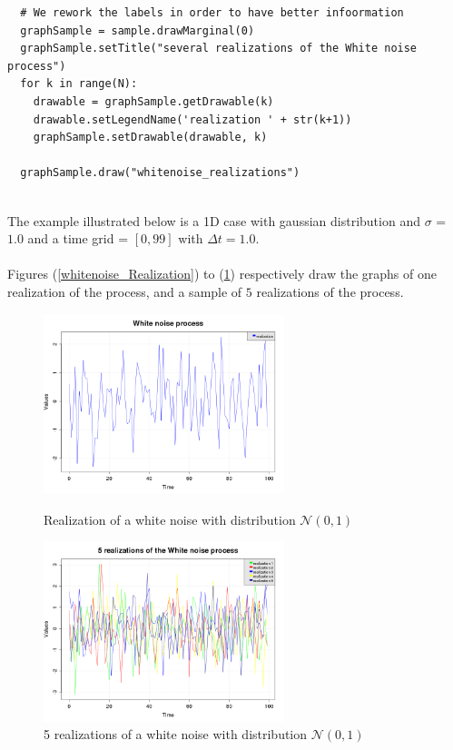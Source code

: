 \begin{lstlisting}
  # We rework the labels in order to have better infoormation
  graphSample = sample.drawMarginal(0)
  graphSample.setTitle("several realizations of the White noise process")
  for k in range(N):
    drawable = graphSample.getDrawable(k)
    drawable.setLegendName('realization ' + str(k+1))
    graphSample.setDrawable(drawable, k)

  graphSample.draw("whitenoise_realizations")

\end{lstlisting}

\textspace\\
The example illustrated below is a 1D case with gaussian distribution and $\sigma$ = $1.0$ and a time grid = $[0,99]$ with $\Delta t = 1.0$.\\ \\

Figures (\ref{whitenoise_Realization}) to (\ref{whitenoise_Realizations}) respectively draw the graphs of one realization of the process, and a sample of $5$ realizations of the process.


\begin{figure}[H]
  \begin{minipage}{9cm}
    \begin{center}
      \includegraphics[width=7cm]{whitenoise_realization.png}
      \caption{Realization of a white noise with distribution $\mathcal{N}(0, 1)$}
      \label{whitenoise_Realization}
    \end{center}
  \end{minipage}
  \hfill
  \begin{minipage}{9cm}
    \begin{center}
      \includegraphics[width=7cm]{whitenoise_realizations.png}
      \caption{5 realizations of a white noise with distribution $\mathcal{N}(0, 1)$}
      \label{whitenoise_Realizations}
    \end{center}
  \end{minipage}
\end{figure}


